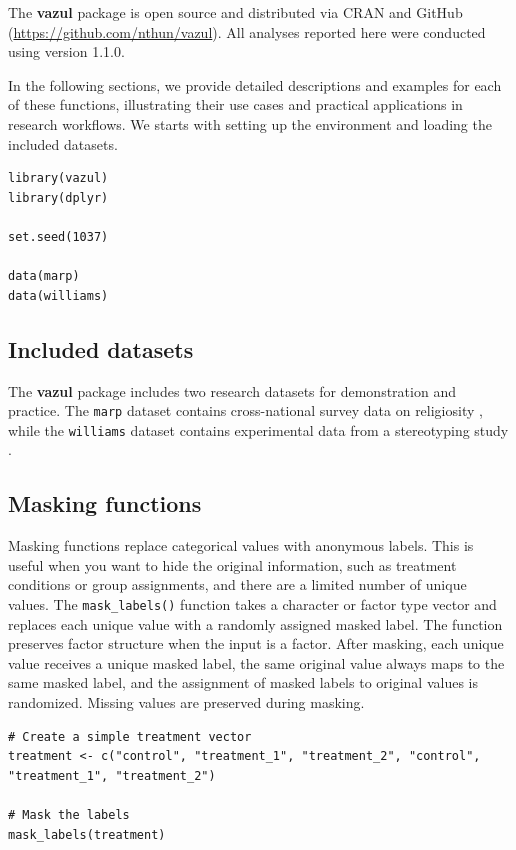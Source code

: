 The \textbf{vazul} package is open source and distributed via CRAN and GitHub (\url{https://github.com/nthun/vazul}). All analyses reported here were conducted using version 1.1.0.

In the following sections, we provide detailed descriptions and examples for each of these functions, illustrating their use cases and practical applications in research workflows. We starts with setting up the environment and loading the included datasets.

\begin{verbatim}
library(vazul)
library(dplyr)

set.seed(1037)

data(marp)
data(williams)
\end{verbatim}

\subsection{Included datasets}\label{included-datasets}

The \textbf{vazul} package includes two research datasets for demonstration and practice. The \texttt{marp} dataset contains cross-national survey data on religiosity \citep{MARP2022discussion}, while the \texttt{williams} dataset contains experimental data from a stereotyping study \citep{Sarafoglou2025-fr, Holzmeister2025-vf}.

\subsection{Masking functions}\label{masking-functions}

Masking functions replace categorical values with anonymous labels. This is useful when you want to hide the original information, such as treatment conditions or group assignments, and there are a limited number of unique values. The \texttt{mask\_labels()} function takes a character or factor type vector and replaces each unique value with a randomly assigned masked label. The function preserves factor structure when the input is a factor. After masking, each unique value receives a unique masked label, the same original value always maps to the same masked label, and the assignment of masked labels to original values is randomized. Missing values are preserved during masking.

\begin{verbatim}
# Create a simple treatment vector
treatment <- c("control", "treatment_1", "treatment_2", "control", "treatment_1", "treatment_2")

# Mask the labels
mask_labels(treatment)
\end{verbatim}

